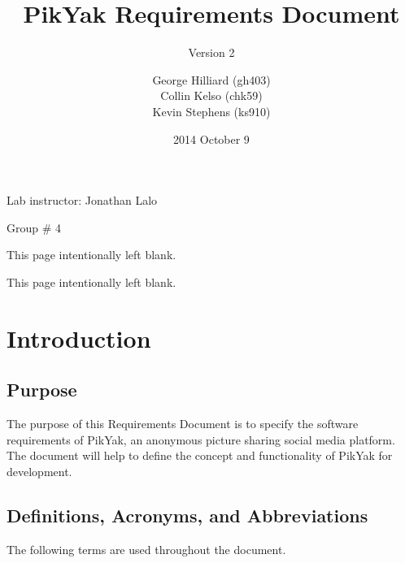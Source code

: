 \documentclass[11pt]{scrartcl}
\title{PikYak Requirements Document}
\subtitle{Version 2}
\author{
    George Hilliard (gh403) \\
    Collin Kelso (chk59) \\
    Kevin Stephens (ks910)
}
\date{2014 October 9}
\newcommand*{\blankpage}{%
\clearpage
\vspace*{\fill}
\centerline{This page intentionally left blank.}
\vspace{\fill}
\clearpage}
\let\stdsection\section
\renewcommand\section{\newpage\stdsection}
\begin{document}

\maketitle

\begin{center}
Lab instructor: Jonathan Lalo

Group \# 4
\end{center}

\blankpage

\tableofcontents

\blankpage


\section{Introduction}
    \subsection{Purpose}
        The purpose of this Requirements Document is to specify the software requirements of PikYak, an anonymous picture sharing social media platform.
        The document will help to define the concept and functionality of PikYak for development.

    \subsection{Definitions, Acronyms, and Abbreviations}
        The following terms are used throughout the document.
\end{document}

